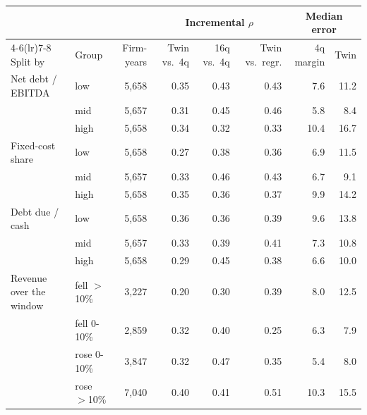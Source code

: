 \begin{tabular}{llrrrrrr}
\toprule
 & & & \multicolumn{3}{c}{Incremental $\rho$} & \multicolumn{2}{c}{Median error} \\
\cmidrule(lr){4-6}\cmidrule(lr){7-8}
Split by & Group & Firm-years & Twin vs.\ 4q & 16q vs.\ 4q & Twin vs.\ regr. & 4q margin & Twin \\
\midrule
Net debt / EBITDA & low & 5{,}658 & 0.35 & 0.43 & 0.43 & 7.6 & 11.2 \\
 & mid & 5{,}657 & 0.31 & 0.45 & 0.46 & 5.8 & 8.4 \\
 & high & 5{,}658 & 0.34 & 0.32 & 0.33 & 10.4 & 16.7 \\
\addlinespace
Fixed-cost share & low & 5{,}658 & 0.27 & 0.38 & 0.36 & 6.9 & 11.5 \\
 & mid & 5{,}657 & 0.33 & 0.46 & 0.43 & 6.7 & 9.1 \\
 & high & 5{,}658 & 0.35 & 0.36 & 0.37 & 9.9 & 14.2 \\
\addlinespace
Debt due / cash & low & 5{,}658 & 0.36 & 0.36 & 0.39 & 9.6 & 13.8 \\
 & mid & 5{,}657 & 0.33 & 0.39 & 0.41 & 7.3 & 10.8 \\
 & high & 5{,}658 & 0.29 & 0.45 & 0.38 & 6.6 & 10.0 \\
\addlinespace
Revenue over the window & fell $>$10\% & 3{,}227 & 0.20 & 0.30 & 0.39 & 8.0 & 12.5 \\
 & fell 0-10\% & 2{,}859 & 0.32 & 0.40 & 0.25 & 6.3 & 7.9 \\
 & rose 0-10\% & 3{,}847 & 0.32 & 0.47 & 0.35 & 5.4 & 8.0 \\
 & rose $>$10\% & 7{,}040 & 0.40 & 0.41 & 0.51 & 10.3 & 15.5 \\
\bottomrule
\end{tabular}

